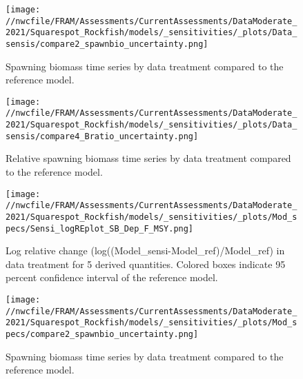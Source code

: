 \documentclass[11pt,
  english,
  a4paper,
]{article}
\begin{document}
\begin{figure}
\centering
\texttt{[image: //nwcfile/FRAM/Assessments/CurrentAssessments/DataModerate\_2021/Squarespot\_Rockfish/models/\_sensitivities/\_plots/Data\_sensis/compare2\_spawnbio\_uncertainty.png]}
\caption{Spawning biomass time series by data treatment compared to the reference model.\label{fig:sensi-data-ssb}}
\end{figure}

\tagmcend\tagstructend


\begin{figure}
\centering
\texttt{[image: //nwcfile/FRAM/Assessments/CurrentAssessments/DataModerate\_2021/Squarespot\_Rockfish/models/\_sensitivities/\_plots/Data\_sensis/compare4\_Bratio\_uncertainty.png]}
\caption{Relative spawning biomass time series by data treatment compared to the reference model.\label{fig:sensi-data-depl}}
\end{figure}

\tagmcend\tagstructend


\begin{figure}
\centering
\texttt{[image: //nwcfile/FRAM/Assessments/CurrentAssessments/DataModerate\_2021/Squarespot\_Rockfish/models/\_sensitivities/\_plots/Mod\_specs/Sensi\_logREplot\_SB\_Dep\_F\_MSY.png]}
\caption{Log relative change (log((Model\_sensi-Model\_ref)/Model\_ref) in data treatment for 5 derived quantities. Colored boxes indicate 95 percent confidence interval of the reference model.\label{fig:sensi-modspec-RE}}
\end{figure}

\tagmcend\tagstructend


\begin{figure}
\centering
\texttt{[image: //nwcfile/FRAM/Assessments/CurrentAssessments/DataModerate\_2021/Squarespot\_Rockfish/models/\_sensitivities/\_plots/Mod\_specs/compare2\_spawnbio\_uncertainty.png]}
\caption{Spawning biomass time series by data treatment compared to the reference model.\label{fig:sensi-modspec-ssb}}
\end{figure}
\end{document}
